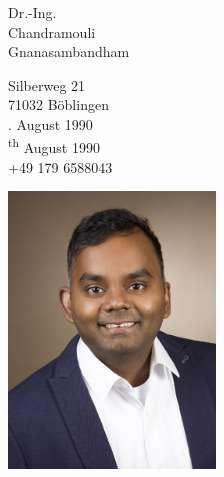 \documentclass{classic}
\begin{document}
\sloppy %
\color{templateColor1}

\normalfont
\begin{minipage}[]{0.68\textwidth}
    \vspace{10mm}

    {\huge Dr.-Ing. }\\

    {\Huge Chandramouli}\\

    {\Huge Gnanasambandham}
    \vspace{2mm}

    \vspace{2mm}

    {\large
        Silberweg 21\\
        71032 B\"oblingen\\

        {
            . August 1990\\
        }
        {
            \textsuperscript{th} August 1990\\
        }
        \telephoneIcon +49 179 6588043\\
        \mailIcon \href{mailto:chandramouli681990@gmail.com}{}
    }
  
    \vspace{13mm}
\end{minipage}
\begin{minipage}[c]{0.32\textwidth}
  \includegraphics[width=5.5cm]{../../img/ChandramouliNew1.jpg}
\end{minipage}
\end{document}
